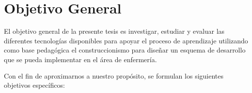 \section{Objetivo General}

El objetivo general de la presente tesis es investigar, estudiar y evaluar 
las diferentes tecnologías disponibles para apoyar el proceso de aprendizaje 
utilizando como base pedagógica el construccionismo para  diseñar un esquema 
de desarrollo que se pueda implementar en el área de enfermería. 






Con el fin de aproximarnos a nuestro propósito, se formulan los siguientes
objetivos específicos:

